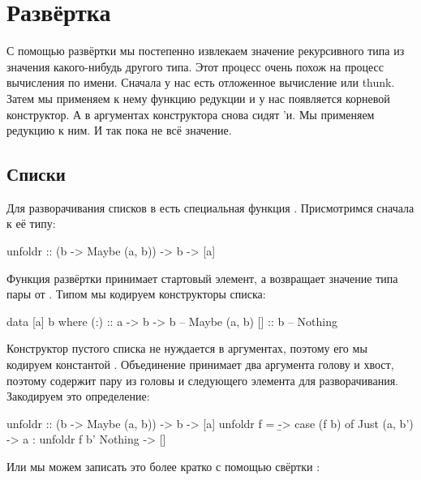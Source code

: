 \section{Развёртка}

С помощью развёртки мы постепенно извлекаем значение
рекурсивного типа из значения какого-нибудь другого типа.
Этот процесс очень похож на процесс вычисления по имени.
Сначала у нас есть отложенное вычисление или thunk. 
Затем мы применяем к нему функцию редукции и у нас появляется 
корневой конструктор.
А в аргументах конструктора снова сидят 'и. Мы применяем
редукцию к ним. И так пока не  всё значение.

\subsection{Списки}

Для разворачивания списков в  есть специальная
функция . Присмотримся сначала к её типу:

\begin{code}
unfoldr :: (b -> Maybe (a, b)) -> b -> [a]
\end{code}

Функция развёртки принимает стартовый элемент, а возвращает
значение типа пары от . Типом  мы кодируем 
конструкторы списка:

\begin{code}
data [a] b where
    (:)  :: a -> b -> b     -- Maybe (a, b)
    []   :: b               -- Nothing
\end{code}

Конструктор пустого списка не нуждается в аргументах, поэтому
его мы кодируем константой . Объединение принимает
два аргумента голову и хвост, поэтому  содержит пару
из головы и следующего элемента для разворачивания.
Закодируем это определение:

\begin{code}
unfoldr :: (b -> Maybe (a, b)) -> b -> [a]
unfoldr f = \b -> case (f b) of
    Just (a, b') -> a : unfoldr f b'
    Nothing      -> []
\end{code}

Или мы можем записать это более кратко с помощью свёртки :


